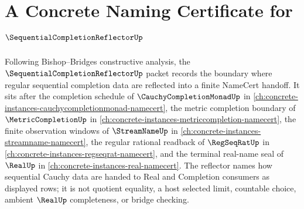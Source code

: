 \chapter{A Concrete Naming Certificate for $\SequentialCompletionReflectorUp$}
\label{ch:concrete-instances-sequential-completion-reflector-namecert}

Following Bishop--Bridges constructive analysis, the $\SequentialCompletionReflectorUp$ packet records the boundary where regular sequential completion data are reflected into a finite NameCert handoff. It sits after the completion schedule of $\CauchyCompletionMonadUp$ in \autoref{ch:concrete-instances-cauchycompletionmonad-namecert}, the metric completion boundary of $\MetricCompletionUp$ in \autoref{ch:concrete-instances-metriccompletion-namecert}, the finite observation windows of $\StreamNameUp$ in \autoref{ch:concrete-instances-streamname-namecert}, the regular rational readback of $\RegSeqRatUp$ in \autoref{ch:concrete-instances-regseqrat-namecert}, and the terminal real-name seal of $\RealUp$ in \autoref{ch:concrete-instances-real-namecert}. The reflector names how sequential Cauchy data are handed to Real and Completion consumers as displayed rows; it is not quotient equality, a host selected limit, countable choice, ambient $\RealUp$ completeness, or bridge checking.

